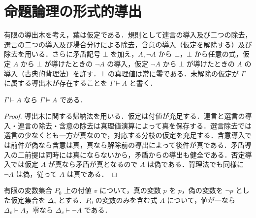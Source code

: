 \section{命題論理の形式的導出}
\begin{defn}[古典命題論理の自然演繹]
有限の導出木を考え，葉は仮定である．規則として連言の導入及び二つの除去，選言の二つの導入及び場合分けによる除去，含意の導入（仮定を解除する）及び除去を用いる．さらに矛盾記号 $\bot$ を加え，$A,\neg A$ から $\bot$，$\bot$ から任意の式，仮定 $A$ から $\bot$ が導けたときの $\neg A$ の導入，仮定 $\neg A$ から $\bot$ が導けたときの $A$ の導入（古典的背理法）を許す．$\bot$ の真理値は常に零である．未解除の仮定が $\Gamma$ に属する導出木が存在することを $\Gamma\vdash A$ と書く．
\end{defn}
\begin{prop}[自然演繹の健全性]
$\Gamma\vdash A$ なら $\Gamma\models A$ である．
\end{prop}
\begin{proof}
導出木に関する帰納法を用いる．仮定は付値が充足する．連言と選言の導入・連言の除去・含意の除去は真理値演算によって真を保存する．選言除去では選言の少なくとも一方が真なので，対応する分枝の仮定を充足する．含意導入では前件が偽なら含意は真，真なら解除前の導出によって後件が真である．矛盾導入の二前提は同時には真にならないから，矛盾からの導出も健全である．否定導入では仮定 $A$ が真なら矛盾が真となるので $A$ は偽である．背理法でも同様に $\neg A$ は偽，従って $A$ は真である．
\end{proof}
\begin{prop}[付値に対応する符号付き導出]
有限の変数集合 $P_0$ 上の付値 $v$ について，真の変数 $p$ を $p$，偽の変数を $\neg p$ とした仮定集合を $\Delta_v$ とする．$P_0$ の変数のみを含む式 $A$ について，値が一なら $\Delta_v\vdash A$，零なら $\Delta_v\vdash\neg A$ である．
\end{prop}
